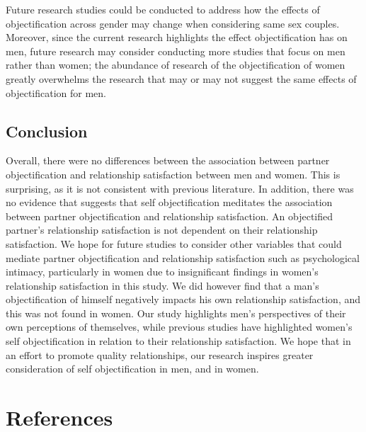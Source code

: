 \documentclass[
  man]{apa6}
\begin{document}
Future research studies could be conducted to address how the effects of objectification across gender may change when considering same sex couples. Moreover, since the current research highlights the effect objectification has on men, future research may consider conducting more studies that focus on men rather than women; the abundance of research of the objectification of women greatly overwhelms the research that may or may not suggest the same effects of objectification for men.

\hypertarget{conclusion}{%
\subsection{Conclusion}\label{conclusion}}

Overall, there were no differences between the association between partner objectification and relationship satisfaction between men and women. This is surprising, as it is not consistent with previous literature. In addition, there was no evidence that suggests that self objectification meditates the association between partner objectification and relationship satisfaction. An objectified partner's relationship satisfaction is not dependent on their relationship satisfaction. We hope for future studies to consider other variables that could mediate partner objectification and relationship satisfaction such as psychological intimacy, particularly in women due to insignificant findings in women's relationship satisfaction in this study. We did however find that a man's objectification of himself negatively impacts his own relationship satisfaction, and this was not found in women. Our study highlights men's perspectives of their own perceptions of themselves, while previous studies have highlighted women's self objectification in relation to their relationship satisfaction. We hope that in an effort to promote quality relationships, our research inspires greater consideration of self objectification in men, and in women.

\newpage

\hypertarget{references}{%
\section{References}\label{references}}

\begingroup
\setlength{\parindent}{-0.5in}
\setlength{\leftskip}{0.5in}
\end{document}
